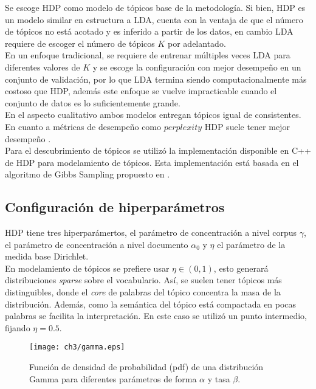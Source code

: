 Se escoge HDP como modelo de tópicos base de la metodología. Si bien, HDP es un modelo similar en estructura a LDA, cuenta con la ventaja de que el número de tópicos no está acotado y es inferido a partir de los datos, en cambio LDA requiere de escoger el número de tópicos $K$ por adelantado. \\

En un enfoque tradicional, se requiere de entrenar múltiples veces LDA para diferentes valores de $K$ y se escoge la configuración con mejor desempeño en un conjunto de validación, por lo que LDA termina siendo computacionalmente más costoso que HDP, además este enfoque se vuelve impracticable cuando el conjunto de datos es lo suficientemente grande. \\

En el aspecto cualitativo ambos modelos entregan tópicos igual de consistentes. En cuanto a métricas de desempeño como $\textit{perplexity}$ HDP suele tener mejor desempeño \citep{teh2005sharing}.\\

Para el descubrimiento de tópicos se utilizó la implementación disponible en C++ \citep{HDP} de HDP para modelamiento de tópicos. Esta implementación está basada en el algoritmo de Gibbs Sampling propuesto en \citep{teh2005sharing}.

\subsection{Configuración de hiperparámetros}
\label{sec:hdp_hiperparameters}

HDP tiene tres hiperparámertos, el parámetro de concentración a nivel corpus $\gamma$, el parámetro de concentración a nivel documento $\alpha_{0}$ y $\eta$ el parámetro de la medida base Dirichlet.\\

En modelamiento de tópicos se prefiere usar $\eta\in (0,1)$, esto generará distribuciones \textit{sparse} sobre el vocabulario. Así, se suelen tener tópicos más distinguibles, donde el \textit{core} de palabras del tópico concentra la masa de la distribución. Además, como la semántica del tópico está compactada en pocas palabras se facilita la interpretación. En este caso se utilizó un punto intermedio, fijando $\eta=0.5$.\\ 

\begin{figure}
    \texttt{[image: ch3/gamma.eps]}
    \caption{Función de densidad de probabilidad (pdf) de una distribución Gamma para diferentes parámetros de forma $\alpha$ y tasa $\beta$.}
    \label{img:gamma}
\end{figure}

